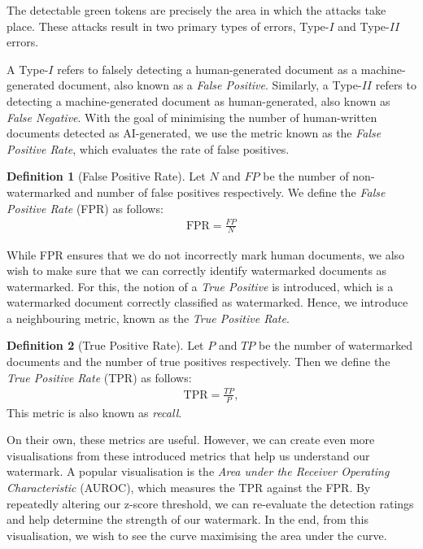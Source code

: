 \documentclass{l4proj}
\theoremstyle{definition}
\newtheorem{definition}{Definition}[section]
\begin{document}
        The detectable green tokens are precisely the area in which the attacks take place. These attacks result in two primary types of errors, Type-$I$ and Type-$II$ errors. 
        
        A Type-$I$ refers to falsely detecting a human-generated document as a machine-generated document, also known as a \emph{False Positive}. Similarly, a Type-$II$ refers to detecting a machine-generated document as human-generated, also known as \emph{False Negative}. With the goal of minimising the number of human-written documents detected as AI-generated, we use the metric known as the \emph{False Positive Rate}, which evaluates the rate of false positives.

        \begin{definition}[False Positive Rate]
            Let $N$ and $FP$ be the number of non-watermarked and number of false positives respectively. We define the \emph{False Positive Rate} (FPR) as follows:
            \begin{align*}
                \text{FPR} = \frac{FP}{N}
            \end{align*}
        \end{definition}

        While FPR ensures that we do not incorrectly mark human documents, we also wish to make sure that we can correctly identify watermarked documents as watermarked. For this, the notion of a \emph{True Positive} is introduced, which is a watermarked document correctly classified as watermarked. Hence, we introduce a neighbouring metric, known as the \emph{True Positive Rate}. 

        \begin{definition}[True Positive Rate]
            Let $P$ and $TP$ be the number of watermarked documents and the number of true positives respectively. Then we define the \emph{True Positive Rate} (TPR) as follows:
            \begin{align*}
                \text{TPR} = \frac{TP}{P},
            \end{align*}
            This metric is also known as \emph{recall}.
        \end{definition}

        On their own, these metrics are useful. However, we can create even more visualisations from these introduced metrics that help us understand our watermark. A popular visualisation is the \emph{Area under the Receiver Operating Characteristic} (AUROC), which measures the TPR against the FPR. By repeatedly altering our z-score threshold, we can re-evaluate the detection ratings and help determine the strength of our watermark. In the end, from this visualisation, we wish to see the curve maximising the area under the curve.
        
\end{document}
